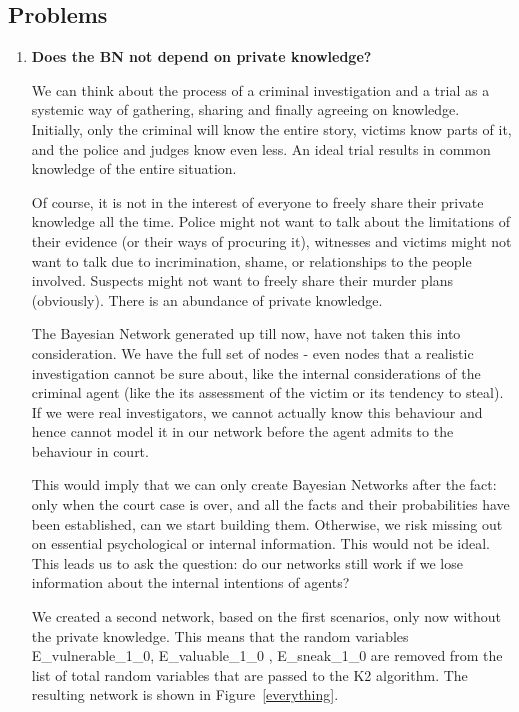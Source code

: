 \subsection{Problems}
\begin{enumerate}


\item \textbf{Does the BN not depend on private knowledge?}

We can think about the process of a criminal investigation and a trial as a systemic way
of gathering, sharing and finally agreeing on knowledge. Initially, only the criminal will
know the entire story, victims know parts of it, and the police and judges know even less.
An ideal trial results in common knowledge of the entire situation.

Of course, it is not in the interest of everyone to freely share their private knowledge all
the time. Police might not want to talk about the limitations of their evidence (or their
ways of procuring it), witnesses and victims might not want to talk due to incrimination,
shame, or relationships to the people involved. Suspects might not want to freely share
their murder plans (obviously). There is an abundance of private knowledge.

The Bayesian Network generated up till now, have not taken this into consideration. We
have the full set of nodes - even nodes that a realistic investigation cannot be sure about,
like the internal considerations of the criminal agent (like the its assessment of the victim or its tendency to steal). If we were real investigators, we cannot actually know this behaviour and hence cannot model
it in our network before the agent admits to the behaviour in court.

This would imply that we can only create Bayesian Networks after the fact: only when the
court case is over, and all the facts and their probabilities have been established, can we
start building them. Otherwise, we risk missing out on essential psychological or internal
information. This would not be ideal. This leads us to ask the question: do our networks
still work if we lose information about the internal intentions of agents?

We created a second network, based on the first scenarios, only now without the private knowledge. This means that the random variables E\_vulnerable\_1\_0, E\_valuable\_1\_0 , E\_sneak\_1\_0 are removed from the list of total random variables that are passed to the K2 algorithm. The resulting network is shown in Figure~\ref{everything}.


\end{enumerate}
